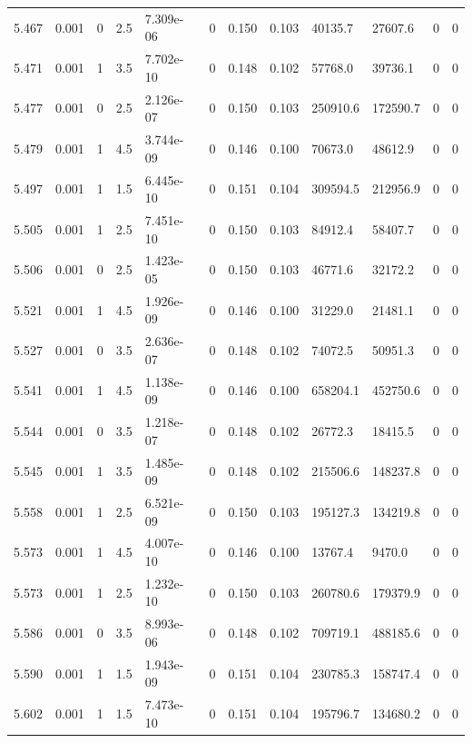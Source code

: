 \documentclass[preview]{standalone}
\begin{document}
{{{{{{{{{{{{{\begin{tabular}{L{1.2cm}C{1.2cm} C{0.3cm}C{0.5cm} C{1.4cm}C{1.4cm} C{1.4cm}C{1.4cm} C{1.6cm}C{1.6cm} C{1.6cm}C{1.6cm}}
  5.467  &  0.001  & 0     & 2.5 &  7.309e-06  & 0  &  0.150&   0.103& 40135.7 & 27607.6   &  0 & 0  \\ 
  5.471  &  0.001  & 1     & 3.5 &  7.702e-10  & 0  &  0.148&   0.102& 57768.0 & 39736.1   &  0 & 0  \\ 
  5.477  &  0.001  & 0     & 2.5 &  2.126e-07  & 0  &  0.150&   0.103& 250910.6 & 172590.7   &  0 & 0  \\ 
  5.479  &  0.001  & 1     & 4.5 &  3.744e-09  & 0  &  0.146&   0.100& 70673.0 & 48612.9   &  0 & 0  \\ 
  5.497  &  0.001  & 1     & 1.5 &  6.445e-10  & 0  &  0.151&   0.104& 309594.5 & 212956.9   &  0 & 0  \\ 
  5.505  &  0.001  & 1     & 2.5 &  7.451e-10  & 0  &  0.150&   0.103& 84912.4 & 58407.7   &  0 & 0  \\ 
  5.506  &  0.001  & 0     & 2.5 &  1.423e-05  & 0  &  0.150&   0.103& 46771.6 & 32172.2   &  0 & 0  \\ 
  5.521  &  0.001  & 1     & 4.5 &  1.926e-09  & 0  &  0.146&   0.100& 31229.0 & 21481.1   &  0 & 0  \\ 
  5.527  &  0.001  & 0     & 3.5 &  2.636e-07  & 0  &  0.148&   0.102& 74072.5 & 50951.3   &  0 & 0  \\ 
  5.541  &  0.001  & 1     & 4.5 &  1.138e-09  & 0  &  0.146&   0.100& 658204.1 & 452750.6   &  0 & 0  \\ 
  5.544  &  0.001  & 0     & 3.5 &  1.218e-07  & 0  &  0.148&   0.102& 26772.3 & 18415.5   &  0 & 0  \\ 
  5.545  &  0.001  & 1     & 3.5 &  1.485e-09  & 0  &  0.148&   0.102& 215506.6 & 148237.8   &  0 & 0  \\ 
  5.558  &  0.001  & 1     & 2.5 &  6.521e-09  & 0  &  0.150&   0.103& 195127.3 & 134219.8   &  0 & 0  \\ 
  5.573  &  0.001  & 1     & 4.5 &  4.007e-10  & 0  &  0.146&   0.100& 13767.4 & 9470.0   &  0 & 0  \\ 
  5.573  &  0.001  & 1     & 2.5 &  1.232e-10  & 0  &  0.150&   0.103& 260780.6 & 179379.9   &  0 & 0  \\ 
  5.586  &  0.001  & 0     & 3.5 &  8.993e-06  & 0  &  0.148&   0.102& 709719.1 & 488185.6   &  0 & 0  \\ 
  5.590  &  0.001  & 1     & 1.5 &  1.943e-09  & 0  &  0.151&   0.104& 230785.3 & 158747.4   &  0 & 0  \\ 
  5.602  &  0.001  & 1     & 1.5 &  7.473e-10  & 0  &  0.151&   0.104& 195796.7 & 134680.2   &  0 & 0  \\ 

\end{tabular}}}}}}}}}}}}}}
\end{document}
